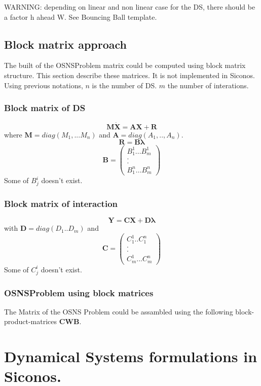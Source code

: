 \documentclass[10pt]{report}
\begin{document}
WARNING: depending on linear and non linear case for the DS, there should be a factor h ahead W. See Bouncing Ball template. 
\section{Block matrix approach}
The built of the OSNSProblem matrix could be computed using block
matrix structure. This section describe these matrices. It is not
implemented in Siconos.
Using previous notations, $n$ is the number of DS. $m$ the number of
interations.

\subsection{Block matrix of DS}
\[\boldsymbol{M}  \boldsymbol{\dot X}=\boldsymbol{A} \boldsymbol{X} + \boldsymbol{R}\]
where $\boldsymbol{M}=diag(M_1,...M_n)$ and
$\boldsymbol{A}=diag(A_1,..,A_n)$.
\[\boldsymbol{R}=\boldsymbol{B}\boldsymbol{\lambda}\]
\[\boldsymbol{B}=\left( \begin{array} {c} B^1_{1}...B^1_m\\.\\.\\
    B^n_1...B^n_m  \end{array}\right)\]
Some of $B^i_j$ doesn't exist.
\subsection{Block matrix of interaction}
\[ \boldsymbol{Y}= \boldsymbol{C}  \boldsymbol{X}+
\boldsymbol{D} \boldsymbol{\lambda}\]
with $ \boldsymbol{D}=diag(D_1..D_m)$ and 
\[ \boldsymbol{C}=\left( \begin{array} {c}
    C^1_{1}..C^n_1\\.\\.\\C^1_{m}...C^n_{m} \end{array}\right)\]
Some of $C^i_j$ doesn't exist.

\subsection{OSNSProblem using block matrices}
The Matrix of the OSNS Problem could be assambled using the following
block-product-matrices $\boldsymbol{C}\boldsymbol{W}\boldsymbol{B}$.
\chapter{Dynamical Systems formulations in Siconos.}
\end{document}

